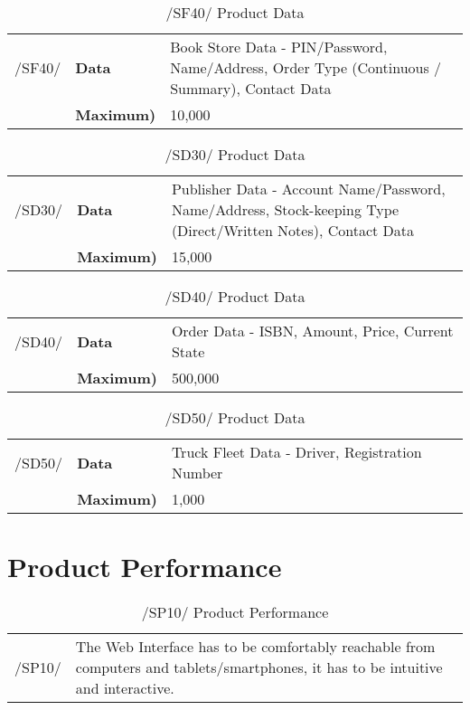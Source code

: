 \documentclass[11pt,a4paper,oneside,svgnames]{report}
\begin{document}
\begin{table}[H]
\centering
\begin{tabular}{p{1.5cm}p{3cm}p{8cm}}
\cellcolor{white}/SF40/	& \textbf{Data}	&  Book Store Data - PIN/Password, Name/Address, Order Type (Continuous / Summary), Contact Data \\
\cellcolor{white}		& \textbf{Maximum)} &  10,000\\
\end{tabular}
\caption{/SF40/ Product Data}
\end{table}

\begin{table}[H]
\centering
\begin{tabular}{p{1.5cm}p{3cm}p{8cm}}
\cellcolor{white}/SD30/	& \textbf{Data}	& Publisher Data - Account Name/Password, Name/Address, Stock-keeping Type (Direct/Written Notes), Contact Data \\
\cellcolor{white}		& \textbf{Maximum)} & 15,000 \\
\end{tabular}
\caption{/SD30/ Product Data}
\end{table}

\begin{table}[H]
\centering
\begin{tabular}{p{1.5cm}p{3cm}p{8cm}}
\cellcolor{white}/SD40/	& \textbf{Data}	& Order Data - ISBN, Amount, Price, Current State\\
\cellcolor{white}		& \textbf{Maximum)} & 500,000 \\
\end{tabular}
\caption{/SD40/ Product Data}
\end{table}

\begin{table}[H]
\centering
\begin{tabular}{p{1.5cm}p{3cm}p{8cm}}
\cellcolor{white}/SD50/	& \textbf{Data}	& Truck Fleet Data - Driver, Registration Number \\
\cellcolor{white}		& \textbf{Maximum)} &  1,000 \\
\end{tabular}
\caption{/SD50/ Product Data}
\end{table}

\chapter{Product Performance}

\begin{table}[H]
\centering
\begin{tabular}{p{1.5cm}p{11cm}}
\cellcolor{white}/SP10/ & The Web Interface has to be comfortably reachable from computers and tablets/smartphones, it has to be intuitive and interactive.\\
\end{tabular}
\caption{/SP10/ Product Performance}
\end{table}
\end{document}
